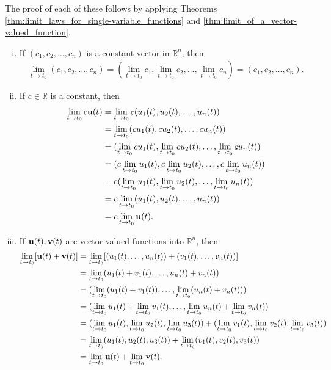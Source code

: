 \documentclass[12pt,letterpaper,reqno]{article}
\numberwithin{equation}{section}
\newcommand{\R}{\ensuremath{\mathbb R}}
\newcommand{\bu}{{\bf u}}
\newcommand{\bv}{{\bf v}}
\begin{document}
{\begin{pf}
The proof of each of these follows by applying Theorems \ref{thm:limit_laws_for_single-variable_functions} and \ref{thm:limit_of_a_vector-valued_function}.
\begin{enumerate}[(i)]
	\item If $(c_1,c_2,\dots,c_n)$ is a constant vector in $\R^n$, then
		\begin{align*}
			\lim_{t \to t_0}(c_1,c_2,\dots,c_n)=(\lim_{t \to t_0} c_1,\lim_{t \to t_0} c_2,\dots,\lim_{t \to t_0} c_n)=(c_1,c_2, \dots, c_n).
		\end{align*}
	\item If $c \in \R$ is a constant, then
	\begin{align*}
		\lim_{t \to t_0}c\bu(t)&=\lim_{t \to t_0}c(u_1(t),u_2(t),\dots,u_n(t)) \\
		&=\lim_{t \to t_0}(cu_1(t),cu_2(t),\dots,cu_n(t)) \\
		&=(\lim_{t \to t_0}cu_1(t),\lim_{t \to t_0}cu_2(t),\dots,\lim_{t \to t_0}cu_n(t)) \\
		&=(c\lim_{t \to t_0}u_1(t),c\lim_{t \to t_0}u_2(t),\dots,c\lim_{t \to t_0}u_n(t)) \\
		&=c(\lim_{t \to t_0}u_1(t),\lim_{t \to t_0}u_2(t),\dots,\lim_{t \to t_0}u_n(t)) \\
		&=c\lim_{t \to t_0}(u_1(t),u_2(t),\dots,u_n(t)) \\
		&=c\lim_{t \to t_0}\bu(t).
	\end{align*}
	\item If $\bu(t),\bv(t)$ are vector-valued functions into $\R^n$, then
	\begin{align*}
		\lim_{t \to t_0}[\bu(t)+\bv(t)]&=\lim_{t \to t_0}[(u_1(t),\dots,u_n(t))+(v_1(t),\dots,v_n(t))] \\
		&=\lim_{t \to t_0}(u_1(t)+v_1(t),\dots,u_n(t)+v_n(t)) \\
		&=(\lim_{t \to t_0}(u_1(t)+v_1(t)),\dots,\lim_{t \to t_0}(u_n(t)+v_n(t))) \\
		&=(\lim_{t \to t_0}u_1(t)+\lim_{t \to t_0}v_1(t),\dots,\lim_{t \to t_0}u_n(t)+\lim_{t \to t_0}v_n(t)) \\
		&=(\lim_{t \to t_0}u_1(t),\lim_{t \to t_0}u_2(t),\lim_{t \to t_0}u_3(t))+(\lim_{t \to t_0}v_1(t),\lim_{t \to t_0}v_2(t),\lim_{t \to t_0}v_3(t)) \\
		&=\lim_{t \to t_0}(u_1(t),u_2(t),u_3(t))+\lim_{t \to t_0}(v_1(t),v_2(t),v_3(t)) \\
		&=\lim_{t \to t_0}\bu(t)+\lim_{t \to t_0}\bv(t).
	\end{align*}

\end{enumerate}
\end{pf}}
\end{document}
